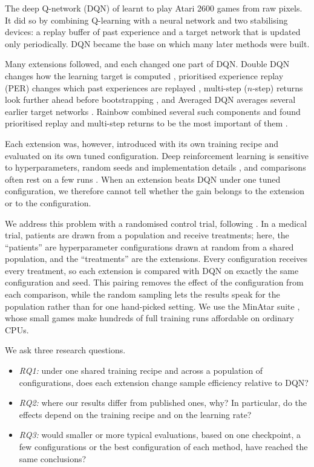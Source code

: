 \documentclass[conference,a4paper]{IEEEtran}
\begin{document}
The deep Q-network (DQN) of \citet{mnih2015human} learnt to play Atari 2600 games from raw pixels. It did so by
combining Q-learning with a neural network and two stabilising devices: a replay buffer of past experience and a
target network that is updated only periodically. DQN became the base on which many later methods were built.

Many extensions followed, and each changed one part of DQN. Double DQN changes how the learning target is
computed \citep{vanhasselt2016deep}, prioritised experience replay (PER) changes which past experiences are replayed
\citep{schaul2016prioritized}, multi-step ($n$-step) returns look further ahead before
bootstrapping \citep{hernandezgarcia2019understanding,sutton2018reinforcement}, and Averaged DQN averages several
earlier target networks \citep{anschel2017averaged}. Rainbow combined several such components and found prioritised
replay and multi-step returns to be the most important of them \citep{hessel2018rainbow}.

Each extension was, however, introduced with its own training recipe and evaluated on its own tuned configuration.
Deep reinforcement learning is sensitive to hyperparameters, random seeds and implementation
details \citep{henderson2018deep}, and comparisons often rest on a few runs \citep{agarwal2021deep}. When an extension
beats DQN under one tuned configuration, we therefore cannot tell whether the gain belongs to the extension or to the
configuration.

We address this problem with a randomised control trial, following \citet{pretorius2020dropout}. In a medical
trial, patients are drawn from a population and receive treatments; here, the ``patients'' are hyperparameter
configurations drawn at random from a shared population, and the ``treatments'' are the extensions. Every
configuration receives every treatment, so each extension is compared with DQN on exactly the same configuration and
seed. This pairing removes the effect of the configuration from each comparison, while the random sampling lets the
results speak for the population rather than for one hand-picked setting. We use the MinAtar suite
\citep{young2019minatar}, whose small games make hundreds of full training runs affordable on ordinary CPUs.

We ask three research questions.
\begin{itemize}
\item \emph{RQ1:} under one shared training recipe and across a population of configurations, does each extension
change sample efficiency relative to DQN?
\item \emph{RQ2:} where our results differ from published ones, why? In particular, do the effects depend on the
training recipe and on the learning rate?
\item \emph{RQ3:} would smaller or more typical evaluations, based on one checkpoint, a few configurations or the best
configuration of each method, have reached the same conclusions?
\end{itemize}
\end{document}
